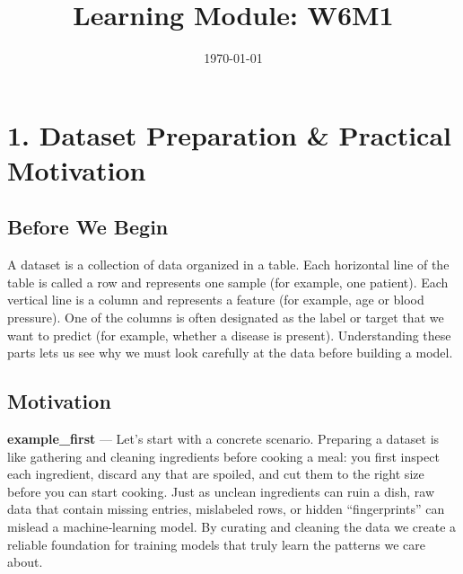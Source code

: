 \documentclass[12pt, a4paper]{article}
\title{Learning Module: W6M1}
\author{}
\date{\today}
\begin{document}
\maketitle
\thispagestyle{empty}
\newpage

\tableofcontents
\newpage


\section{1. Dataset Preparation \& Practical Motivation}

\subsection{Before We Begin}
A dataset is a collection of data organized in a table.  
Each horizontal line of the table is called a row and represents one sample (for example, one patient).  
Each vertical line is a column and represents a feature (for example, age or blood pressure).  
One of the columns is often designated as the label or target that we want to predict (for example, whether a disease is present).  
Understanding these parts lets us see why we must look carefully at the data before building a model.  

\subsection{Motivation}
\textbf{example\_first} — Let’s start with a concrete scenario.  
Preparing a dataset is like gathering and cleaning ingredients before cooking a meal: you first inspect each ingredient, discard any that are spoiled, and cut them to the right size before you can start cooking.  
Just as unclean ingredients can ruin a dish, raw data that contain missing entries, mislabeled rows, or hidden “fingerprints” can mislead a machine‑learning model.  
By curating and cleaning the data we create a reliable foundation for training models that truly learn the patterns we care about.  
\end{document}
